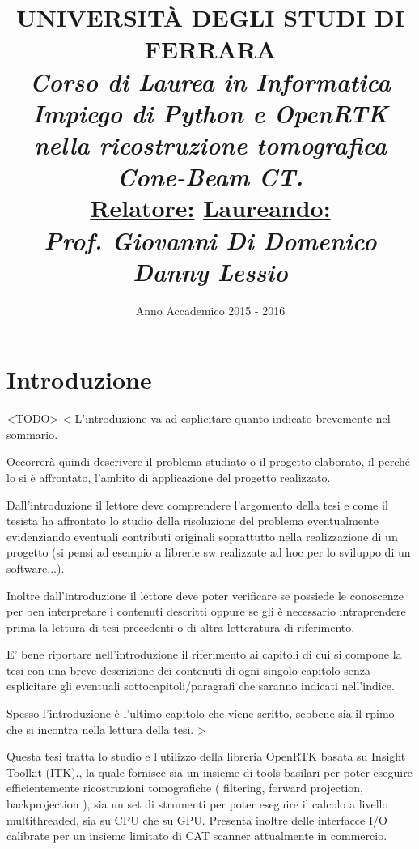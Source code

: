 \documentclass[a4paper,12pt, doubleside]{report}
\title{\textbf{UNIVERSITÀ DEGLI STUDI DI FERRARA\\}
\bigskip
\textit{Corso di Laurea in Informatica}\\
\bigskip
\bigskip
\bigskip
\bigskip
\bigskip
\bigskip
\bigskip
\textit{\textbf{Impiego di Python e OpenRTK nella ricostruzione tomografica Cone-Beam CT.\\}}
\bigskip
\bigskip
\bigskip
\bigskip
\bigskip
\bigskip
\bigskip
\bigskip
\bigskip
\bigskip
\textbf{\underline{Relatore:}}
\hfill
\textbf{\underline{Laureando:}\thinspace\thinspace\thinspace} \\
\textit{Prof. Giovanni Di Domenico}
\hfill
\textit{Danny Lessio}
\bigskip
\bigskip
\bigskip
\bigskip
\bigskip
\bigskip
\bigskip
\bigskip
\bigskip
}
\date{Anno Accademico 2015 - 2016}
\begin{document}
    \maketitle
    \newpage

    \chapter*{Introduzione}
        \par
            <TODO>
            <
        		L'introduzione va ad esplicitare quanto indicato brevemente nel sommario.
        
        		Occorrerà quindi descrivere il problema studiato o il progetto elaborato, il perché lo si è affrontato, l'ambito di applicazione del progetto realizzato.
        
        		Dall'introduzione il lettore deve comprendere l'argomento della tesi e come il tesista ha affrontato lo studio della risoluzione del problema eventualmente evidenziando eventuali contributi originali soprattutto nella realizzazione di un progetto (si pensi ad esempio a librerie sw realizzate ad hoc per lo sviluppo di un software...).
        
        		Inoltre dall'introduzione il lettore deve poter verificare se possiede le conoscenze per ben interpretare i contenuti descritti oppure se gli è necessario intraprendere prima la lettura di tesi precedenti o di altra letteratura di riferimento.
        
        		E' bene riportare nell'introduzione il riferimento ai capitoli di cui si compone la tesi con una breve descrizione dei contenuti di ogni singolo capitolo senza esplicitare gli eventuali sottocapitoli/paragrafi che saranno indicati nell'indice.
        
        		Spesso l'introduzione è l'ultimo capitolo che viene scritto, sebbene sia il rpimo che si incontra nella lettura della tesi.
        	>
        \par
            Questa tesi tratta lo studio e l'utilizzo della libreria OpenRTK \cite{openrtk-website} basata su Insight Toolkit (ITK).\cite{itk-website}, la quale fornisce sia un insieme di tools basilari per poter eseguire efficientemente ricostruzioni tomografiche ( filtering, forward projection, backprojection ), sia un set di strumenti per poter eseguire il calcolo a livello multithreaded, sia su CPU che su GPU. Presenta inoltre delle interfacce I/O calibrate per un insieme limitato di CAT scanner attualmente in commercio.
    
\end{document}
